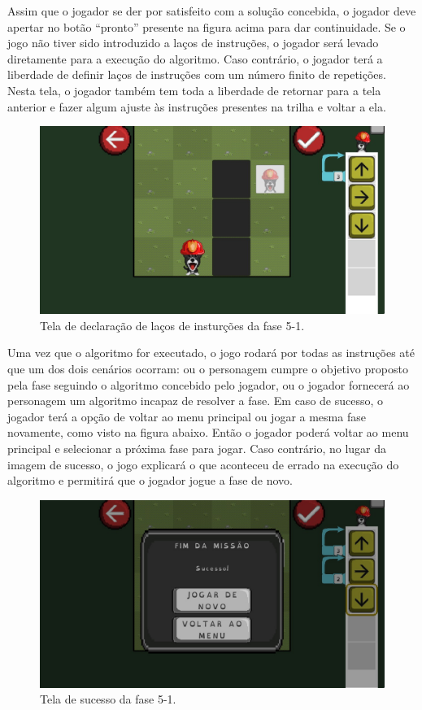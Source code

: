 \documentclass[conference]{IEEEtran}
\begin{document}
Assim que o jogador se der por satisfeito com a solução concebida, o jogador deve apertar no botão ``pronto'' presente na figura acima para dar continuidade. Se o jogo não tiver sido introduzido a laços de instruções, o jogador será levado diretamente para a execução do algoritmo. Caso contrário, o jogador terá a liberdade de definir laços de instruções com um número finito de repetições. Nesta tela, o jogador também tem toda a liberdade de retornar para a tela anterior e fazer algum ajuste às instruções presentes na trilha e voltar a ela.
\begin{figure}[htbp]
\centerline{\includegraphics[scale=0.275]{images/fig02.jpg}}
\caption{Tela de declaração de laços de insturções da fase 5-1.}
\label{fig}
\end{figure}

Uma vez que o algoritmo for executado, o jogo rodará por todas as instruções até que um dos dois cenários ocorram: ou o personagem cumpre o objetivo proposto pela fase seguindo o algoritmo concebido pelo jogador, ou o jogador fornecerá ao personagem um algoritmo incapaz de resolver a fase. Em caso de sucesso, o jogador terá a opção de voltar ao menu principal ou jogar a mesma fase novamente, como visto na figura abaixo. Então o jogador poderá voltar ao menu principal e selecionar a próxima fase para jogar. Caso contrário, no lugar da imagem de sucesso, o jogo explicará o que aconteceu de errado na execução do algoritmo e permitirá que o jogador jogue a fase de novo.
\begin{figure}[htbp]
\centerline{\includegraphics[scale=0.275]{images/fig03.jpg}}
\caption{Tela de sucesso da fase 5-1.}
\label{fig}
\end{figure}
\end{document}
